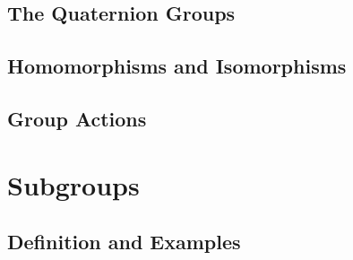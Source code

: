 \documentclass[cn,11pt,chinese]{elegantbook}
\numberwithin{equation}{section}
\begin{document}
\section{The Quaternion Groups}\label{section00105}



\section{Homomorphisms and Isomorphisms}\label{section00106}



\section{Group Actions}\label{section00107}




\chapter{Subgroups}\label{chapter002}
\section{Definition and Examples}\label{section00201}







% 

\appendix
\end{document}
